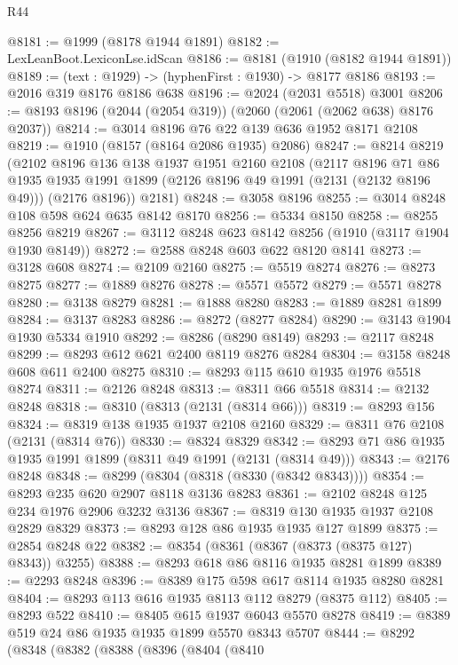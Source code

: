 \begin{lexlean}{R44}
\begin{coremodule}
@8181 := @1999 (@8178 @1944 @1891)
@8182 := LexLeanBoot.LexiconLse.idScan
@8186 := @8181 (@1910 (@8182 @1944 @1891))
@8189 := (text : @1929) -> (hyphenFirst : @1930) -> @8177 @8186
@8193 := @2016 @319 @8176 @8186 @638
@8196 := @2024 (@2031 @5518) @3001
@8206 := @8193 @8196 (@2044 (@2054 @319)) (@2060 (@2061 (@2062 @638) @8176 @2037))
@8214 := @3014 @8196 @76 @22 @139 @636 @1952 @8171 @2108
@8219 := @1910 (@8157 (@8164 @2086 @1935) @2086)
@8247 := @8214
    @8219
    (@2102
      @8196
      @136
      @138
      @1937
      @1951
      @2160
      @2108
      (@2117
        @8196
        @71
        @86
        @1935
        @1935
        @1991
        @1899
        (@2126 @8196 @49 @1991 (@2131 (@2132 @8196 @49)))
        (@2176 @8196))
      @2181)
@8248 := @3058 @8196
@8255 := @3014 @8248 @108 @598 @624 @635 @8142 @8170
@8256 := @5334 @8150
@8258 := @8255 @8256 @8219
@8267 := @3112 @8248 @623 @8142 @8256 (@1910 (@3117 @1904 @1930 @8149))
@8272 := @2588 @8248 @603 @622 @8120 @8141
@8273 := @3128 @608
@8274 := @2109 @2160
@8275 := @5519 @8274
@8276 := @8273 @8275
@8277 := @1889 @8276
@8278 := @5571 @5572
@8279 := @5571 @8278
@8280 := @3138 @8279
@8281 := @1888 @8280
@8283 := @1889 @8281 @1899
@8284 := @3137 @8283
@8286 := @8272 (@8277 @8284)
@8290 := @3143 @1904 @1930 @5334 @1910
@8292 := @8286 (@8290 @8149)
@8293 := @2117 @8248
@8299 := @8293 @612 @621 @2400 @8119 @8276 @8284
@8304 := @3158 @8248 @608 @611 @2400 @8275
@8310 := @8293 @115 @610 @1935 @1976 @5518 @8274
@8311 := @2126 @8248
@8313 := @8311 @66 @5518
@8314 := @2132 @8248
@8318 := @8310 (@8313 (@2131 (@8314 @66)))
@8319 := @8293 @156
@8324 := @8319 @138 @1935 @1937 @2108 @2160
@8329 := @8311 @76 @2108 (@2131 (@8314 @76))
@8330 := @8324 @8329
@8342 := @8293 @71 @86 @1935 @1935 @1991 @1899 (@8311 @49 @1991 (@2131 (@8314 @49)))
@8343 := @2176 @8248
@8348 := @8299 (@8304 (@8318 (@8330 (@8342 @8343))))
@8354 := @8293 @235 @620 @2907 @8118 @3136 @8283
@8361 := @2102 @8248 @125 @234 @1976 @2906 @3232 @3136
@8367 := @8319 @130 @1935 @1937 @2108 @2829 @8329
@8373 := @8293 @128 @86 @1935 @1935 @127 @1899
@8375 := @2854 @8248 @22
@8382 := @8354 (@8361 (@8367 (@8373 (@8375 @127) @8343)) @3255)
@8388 := @8293 @618 @86 @8116 @1935 @8281 @1899
@8389 := @2293 @8248
@8396 := @8389 @175 @598 @617 @8114 @1935 @8280 @8281
@8404 := @8293 @113 @616 @1935 @8113 @112 @8279 (@8375 @112)
@8405 := @8293 @522
@8410 := @8405 @615 @1937 @6043 @5570 @8278
@8419 := @8389 @519 @24 @86 @1935 @1935 @1899 @5570 @8343 @5707
@8444 := @8292
    (@8348
      (@8382
        (@8388
          (@8396
            (@8404
              (@8410

\end{coremodule}
\end{lexlean}
